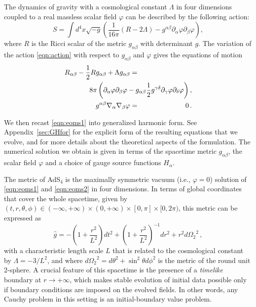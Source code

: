 \documentclass[aps,letterpaper,twocolumn,nofootinbib]{revtex4}
\numberwithin{equation}{section}
\begin{document}
The dynamics of gravity with a cosmological constant $\Lambda$ in four dimensions coupled to a real massless scalar field $\varphi$ can be described by the following action:
\begin{equation}\label{eqn:action}
S = \int d^4 x \sqrt{-g} \left( \frac{1}{16\pi} \left( R - 2\Lambda \right) - g^{\alpha\beta} \partial_\alpha \varphi \partial_\beta \varphi \right),
\end{equation}
where $R$ is the Ricci scalar of the metric $g_{\alpha\beta}$ with determinant $g$.
The variation of the action \eqref{eqn:action} with respect to $g_{\alpha\beta}$ and $\varphi$ gives the equations of motion
\vspace{2\baselineskip}
\begin{eqnarray}
\label{eqn:eoms1}
R_{\alpha\beta}- \frac{1}{2} R g_{\alpha\beta}+ \Lambda g_{\alpha\beta}&=&\nonumber\\
&&\hspace{-2.8cm} 8\pi \left( \partial_\alpha \varphi \partial_\beta \varphi - g_{\alpha\beta} \frac{1}{2} g^{\gamma\delta} \partial_{\gamma} \varphi \partial_{\delta} \varphi \right), \\
\label{eqn:eoms2}
g^{\alpha\beta} \nabla_{\alpha} \nabla_{\beta} \varphi &=& 0\,.
\end{eqnarray}

We then recast \eqref{eqn:eoms1} into generalized harmonic form.
See Appendix~\ref{sec:GHfor} for the explicit form of the resulting equations that we evolve, and \cite{Pretorius:2004jg} for more details about the theoretical aspects of the formulation.
The numerical solution we obtain is given 
in terms of the spacetime metric $g_{\alpha\beta}$, the scalar field $\varphi$ and a choice of gauge source functions $H_\alpha$. 

The metric of AdS$_4$ is the maximally symmetric vacuum (i.e., $\varphi=0$) solution of \eqref{eqn:eoms1} and \eqref{eqn:eoms2} in four dimensions.
In terms of global coordinates that cover the whole spacetime, given by $(t,r,\theta,\phi)\in(-\infty,+\infty)\times(0,+\infty)\times[0,\pi]\times[0,2\pi)$, this metric can be expressed as
\begin{equation}\label{eqn:ads4}
\hat{g}= -\left(1+\frac{r^2}{L^2}\right) dt^2 + \left(1+\frac{r^2}{L^2}\right)^{-1} dr^2 +r^2 d{\Omega_2}^2 \,,
\end{equation}
with a characteristic length scale $L$ that is related to the cosmological constant by $\Lambda = - 3/L^2$, and where $d{\Omega_2}^2 = d\theta^2 + \sin^2\theta d\phi^2$ is the metric of the round unit 2-sphere. 
A crucial feature of this spacetime is the presence of a \emph{timelike} boundary at $r \rightarrow +\infty$, which makes stable evolution of initial data possible only if boundary conditions are imposed on the evolved fields. 
In other words, any Cauchy problem in this setting is an initial-boundary value problem.
\end{document}

